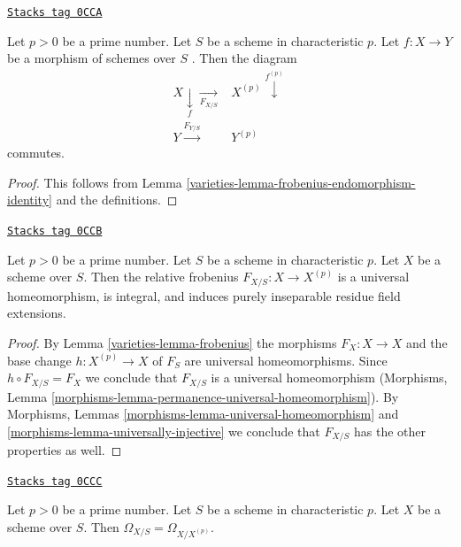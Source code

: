 \begin{lemma}
\label{varieties-lemma-relative-frobenius-endomorphism-identity}
\href{https://stacks.math.columbia.edu/tag/0CCA}{\texttt{Stacks tag 0CCA}}

Let $p > 0$ be a prime number. Let $S$ be a scheme in characteristic $p$.
Let $f : X \to Y$ be a morphism of schemes over $S$ .
Then the diagram
$$
\begin{array}{cc}X \underset{f}{\downarrow}\underset{F_{X/S}}{\longrightarrow} & X^{(p)} \overset{f^{(p)}}{\downarrow} \\ Y \overset{F_{Y/S}}{\longrightarrow} & Y^{(p)}\end{array}
$$
commutes.
\end{lemma}

\begin{proof}

This follows from Lemma \ref{varieties-lemma-frobenius-endomorphism-identity}
and the definitions.
\end{proof}

\begin{lemma}
\label{varieties-lemma-relative-frobenius}
\href{https://stacks.math.columbia.edu/tag/0CCB}{\texttt{Stacks tag 0CCB}}

Let $p > 0$ be a prime number. Let $S$ be a scheme in characteristic $p$.
Let $X$ be a scheme over $S$.
Then the relative frobenius $F_{X/S} : X \to X^{(p)}$
is a universal homeomorphism, is integral, and
induces purely inseparable residue field extensions.
\end{lemma}

\begin{proof}

By Lemma \ref{varieties-lemma-frobenius} the morphisms $F_X : X \to X$ and the base change
$h : X^{(p)} \to X$ of $F_S$ are universal homeomorphisms.
Since $h \circ F_{X/S} = F_X$ we conclude that $F_{X/S}$ is a universal
homeomorphism (Morphisms, Lemma
\ref{morphisms-lemma-permanence-universal-homeomorphism}). By Morphisms, Lemmas
\ref{morphisms-lemma-universal-homeomorphism} and
\ref{morphisms-lemma-universally-injective}
we conclude that $F_{X/S}$ has the other properties as well.
\end{proof}

\begin{lemma}
\label{varieties-lemma-relative-frobenius-omega}
\href{https://stacks.math.columbia.edu/tag/0CCC}{\texttt{Stacks tag 0CCC}}

Let $p > 0$ be a prime number. Let $S$ be a scheme in characteristic $p$.
Let $X$ be a scheme over $S$. Then $\Omega_{X/S} = \Omega_{X/X^{(p)}}$.
\end{lemma}

